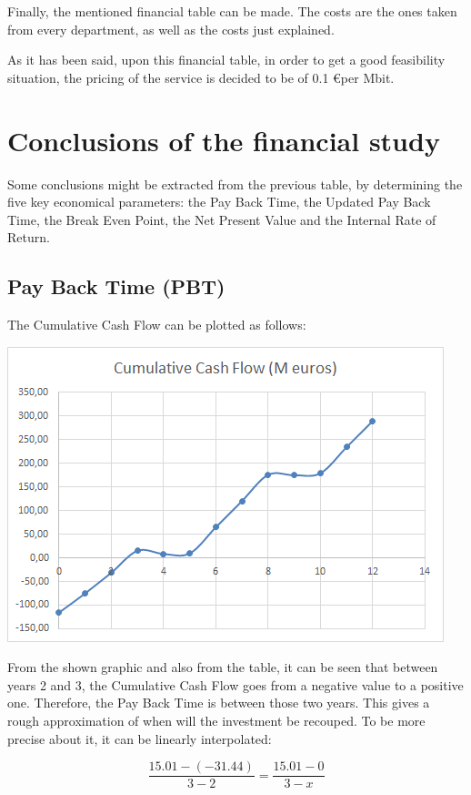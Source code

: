 Finally, the mentioned financial table can be made. The costs are the ones taken from every department, as well as the costs just explained.

As it has been said, upon this financial table, in order to get a good feasibility situation, the pricing of the service is decided to be of 0.1 \euro  per Mbit. 




\section{Conclusions of the financial study}
Some conclusions might be extracted from the previous table, by determining the five key economical parameters: the Pay Back Time, the Updated Pay Back Time, the Break Even Point, the Net Present Value and the Internal Rate of Return. 

\subsection{Pay Back Time (PBT)}
The Cumulative Cash Flow can be plotted as follows:

\includegraphics{CCF.png}

From the shown graphic and also from the table, it can be seen that between years 2 and 3, the Cumulative Cash Flow goes from a negative value to a positive one. Therefore, the Pay Back Time is between those two years. This gives a rough approximation of when will the investment be recouped. To be more precise about it, it can be linearly interpolated:

\begin{equation}
\frac{15.01-(-31.44)}{3-2}=\frac{15.01-0}{3-x}
\end{equation}

